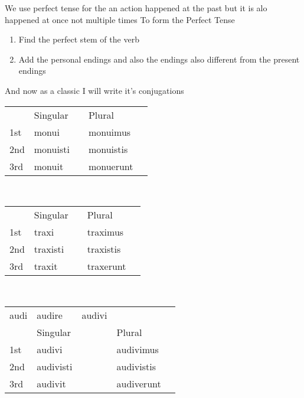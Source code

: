 We use perfect tense for the an action happened at the past but it 
is alo happened at once not multiple times
To form the Perfect Tense
\begin{enumerate}
  \item Find the perfect stem of the verb
  \item Add the personal endings and also the endings also 
    different from the present endings 
\end{enumerate}
And now as a classic I will write it's conjugations 

\begin{center}  
  \begin{tabular}{lllll}
      & Singular  &   & Plural & \\
      1st & monui  &  & monuimus &  \\
      2nd & monuisti &  & monuistis &  \\
      3rd & monuit &  & monuerunt  &  \\
  \end{tabular}
\end{center} \\

\begin{center}  
  \begin{tabular}{lllll}
      & Singular  &   & Plural & \\
      1st & traxi  &  & traximus &  \\
      2nd & traxisti &  & traxistis &  \\
      3rd & traxit &  & traxerunt  &  \\
  \end{tabular}
\end{center} \\


\begin{center}  
  \begin{tabular}{lllll}
      audi & audire & audivi & & \\
      & Singular  &   & Plural & \\
      1st & audivi  &  & audivimus &  \\
      2nd & audivisti &  & audivistis &  \\
      3rd & audivit &  & audiverunt  &  \\
  \end{tabular}
\end{center}

